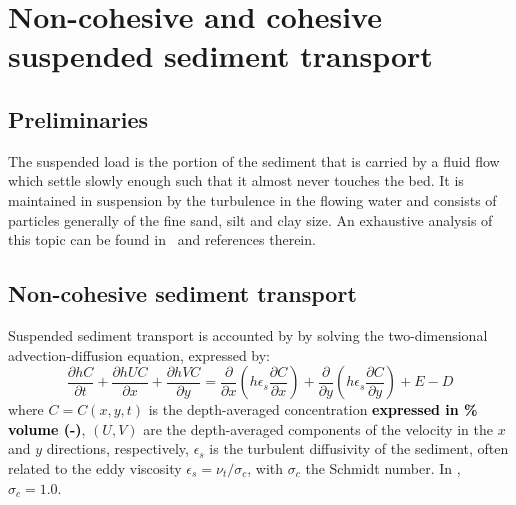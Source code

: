 \chapter[Non-cohesive and cohesive suspended sediment transport]{Non-cohesive and cohesive suspended sediment transport}\label{sec:SuspendedSedimentTransport}

\section{Preliminaries}
The suspended load is the portion of the sediment that is carried by a fluid flow which settle slowly enough such that it almost never touches the bed. It is maintained in suspension by the turbulence in the flowing water and consists of particles generally of the fine sand, silt and clay size. An exhaustive analysis of this topic can be found in~\cite{GarciaBook2006} and references therein.

\section{Non-cohesive sediment transport}

Suspended sediment transport is accounted by \gaia{} by solving the two-dimensional advection-diffusion equation, expressed by:
\begin{equation}\label{eq:2DADE}
\frac{\partial hC}{\partial t} + \frac{\partial hUC}{\partial x} + \frac{\partial hVC}{\partial y} =
\frac{\partial}{\partial x}\left(h\epsilon_s\frac{\partial C}{\partial x}\right) +
\frac{\partial}{\partial y}\left(h\epsilon_s\frac{\partial C}{\partial y}\right) + E-D
\end{equation}
where $C=C(x,y,t)$ is the depth-averaged concentration \textcolor{black}{\bf expressed in \% volume (-)}, $(U,V)$ are the depth-averaged components of the velocity in the $x$ and $y$ directions, respectively, $\epsilon_s$ is the turbulent diffusivity of the sediment, often related to the eddy viscosity $\epsilon_s=\nu_t/\sigma_c$, with $\sigma_c$ the Schmidt number. In \gaia{}, $\sigma_c=1.0$.

